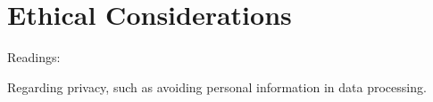 \section{Ethical Considerations}
\label{sec:ethics}


\noindent Readings: %


    Regarding privacy, such as avoiding personal information in data processing.
